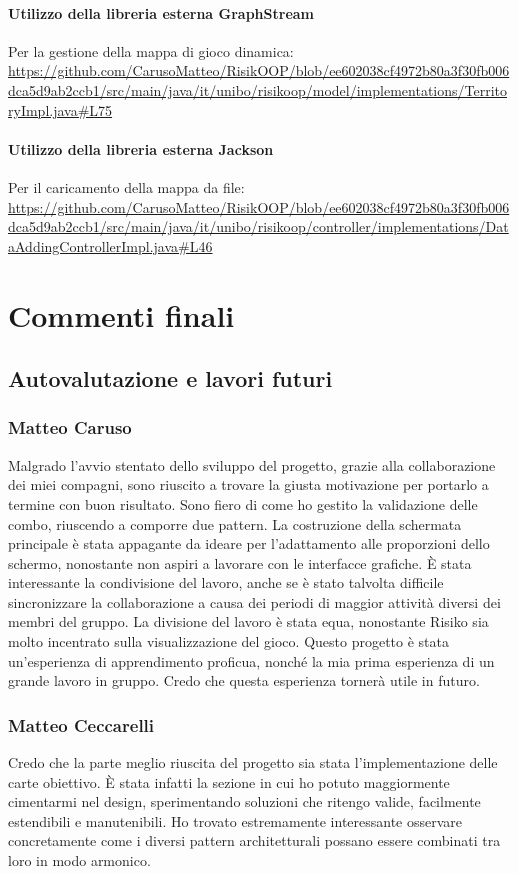 \documentclass[a4paper,12pt]{report}
\begin{document}
\subsubsection{Utilizzo della libreria esterna GraphStream}
Per la gestione della mappa di gioco dinamica: \url{https://github.com/CarusoMatteo/RisikOOP/blob/ee602038cf4972b80a3f30fb006dca5d9ab2ccb1/src/main/java/it/unibo/risikoop/model/implementations/TerritoryImpl.java#L75}
\subsubsection{Utilizzo della libreria esterna Jackson}
Per il caricamento della mappa da file: \url{https://github.com/CarusoMatteo/RisikOOP/blob/ee602038cf4972b80a3f30fb006dca5d9ab2ccb1/src/main/java/it/unibo/risikoop/controller/implementations/DataAddingControllerImpl.java#L46}
\chapter{Commenti finali}

\section{Autovalutazione e lavori futuri}
\subsection{Matteo Caruso}
Malgrado l'avvio stentato dello sviluppo del progetto, grazie alla collaborazione dei miei compagni, sono riuscito a trovare la giusta motivazione per portarlo a termine con buon risultato.
Sono fiero di come ho gestito la validazione delle combo, riuscendo a comporre due pattern.
La costruzione della schermata principale è stata appagante da ideare per l'adattamento alle proporzioni dello schermo, nonostante non aspiri a lavorare con le interfacce grafiche.
È stata interessante la condivisione del lavoro, anche se è stato talvolta difficile sincronizzare la collaborazione a causa dei periodi di maggior attività diversi dei membri del gruppo.
La divisione del lavoro è stata equa, nonostante Risiko sia molto incentrato sulla visualizzazione del gioco.
Questo progetto è stata un'esperienza di apprendimento proficua, nonché la mia prima esperienza di un grande lavoro in gruppo. Credo che questa esperienza tornerà utile in futuro.
\subsection{Matteo Ceccarelli}
Credo che la parte meglio riuscita del progetto sia stata l'implementazione delle carte obiettivo.
È stata infatti la sezione in cui ho potuto maggiormente cimentarmi nel design, sperimentando soluzioni che ritengo valide, facilmente estendibili e manutenibili.
Ho trovato estremamente interessante osservare concretamente come i diversi pattern architetturali possano essere combinati tra loro in modo armonico.
\end{document}
